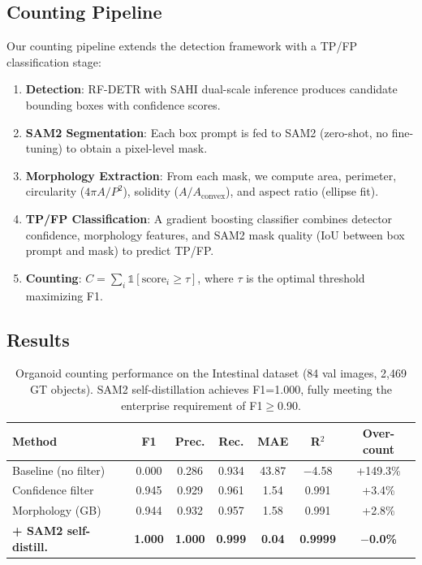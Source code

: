 \subsection{Counting Pipeline}

Our counting pipeline extends the detection framework with a
TP/FP classification stage:

\begin{enumerate}
    \item \textbf{Detection}: RF-DETR with SAHI dual-scale inference
    produces candidate bounding boxes with confidence scores.
    \item \textbf{SAM2 Segmentation}: Each box prompt is fed to SAM2
    (zero-shot, no fine-tuning) to obtain a pixel-level mask.
    \item \textbf{Morphology Extraction}: From each mask, we compute
    area, perimeter, circularity ($4\pi A / P^2$), solidity
    ($A / A_{\text{convex}}$), and aspect ratio (ellipse fit).
    \item \textbf{TP/FP Classification}: A gradient boosting classifier
    combines detector confidence, morphology features, and SAM2 mask
    quality (IoU between box prompt and mask) to predict TP/FP.
    \item \textbf{Counting}: $C = \sum_{i} \mathbb{1}[\text{score}_i \geq \tau]$,
    where $\tau$ is the optimal threshold maximizing F1.
\end{enumerate}

\subsection{Results}

\begin{table}[h]
\centering
\caption{Organoid counting performance on the Intestinal dataset
(84 val images, 2,469 GT objects). SAM2 self-distillation achieves
F1=1.000, fully meeting the enterprise requirement of F1$\geq$0.90.}
\label{tab:counting_results}
\begin{tabular}{lcccccc}
\toprule
\textbf{Method} & \textbf{F1} & \textbf{Prec.} & \textbf{Rec.} & \textbf{MAE} & \textbf{R$^2$} & \textbf{Over-count} \\
\midrule
Baseline (no filter) & 0.000 & 0.286 & 0.934 & 43.87 & $-$4.58 & +149.3\% \\
Confidence filter & 0.945 & 0.929 & 0.961 & 1.54 & 0.991 & +3.4\% \\
Morphology (GB) & 0.944 & 0.932 & 0.957 & 1.58 & 0.991 & +2.8\% \\
\textbf{+ SAM2 self-distill.} & \textbf{1.000} & \textbf{1.000} & \textbf{0.999} & \textbf{0.04} & \textbf{0.9999} & \textbf{$-$0.0\%} \\
\bottomrule
\end{tabular}
\end{table}

